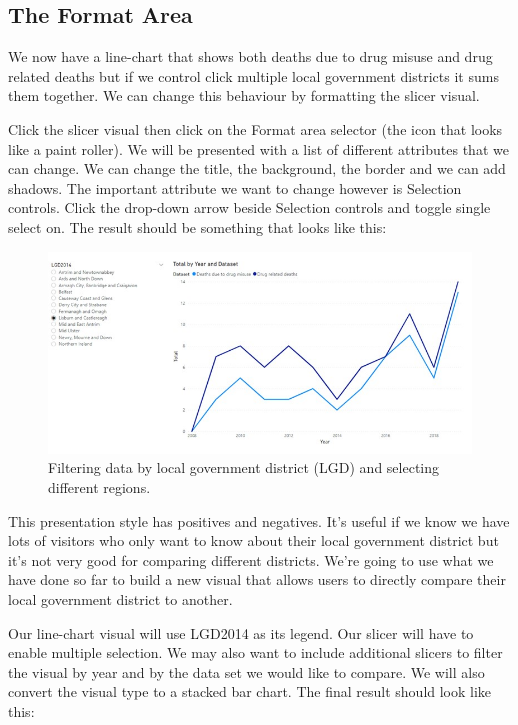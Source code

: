 \documentclass[
]{book}
\begin{document}
\hypertarget{the-format-area}{%
\subsection{The Format Area}\label{the-format-area}}

We now have a line-chart that shows both deaths due to drug misuse and drug related deaths but if we control click multiple local government districts it sums them together. We can change this behaviour by formatting the slicer visual.

Click the slicer visual then click on the Format area selector (the icon that looks like a paint roller). We will be presented with a list of different attributes that we can change. We can change the title, the background, the border and we can add shadows. The important attribute we want to change however is Selection controls. Click the drop-down arrow beside Selection controls and toggle single select on. The result should be something that looks like this:

\begin{figure}
\centering
\includegraphics{bi9.jpg}
\caption{Filtering data by local government district (LGD) and selecting different regions.}
\end{figure}

This presentation style has positives and negatives. It's useful if we know we have lots of visitors who only want to know about their local government district but it's not very good for comparing different districts. We're going to use what we have done so far to build a new visual that allows users to directly compare their local government district to another.

Our line-chart visual will use LGD2014 as its legend. Our slicer will have to enable multiple selection. We may also want to include additional slicers to filter the visual by year and by the data set we would like to compare. We will also convert the visual type to a stacked bar chart. The final result should look like this:
\end{document}
